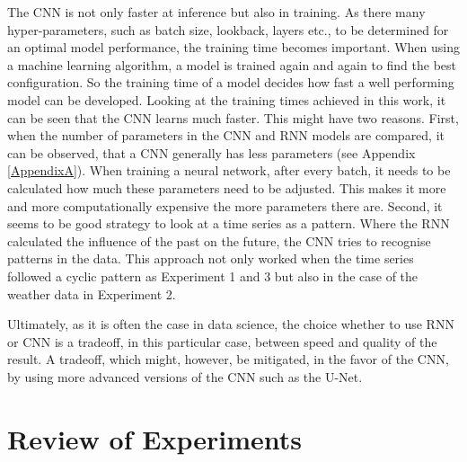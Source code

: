 The CNN is not only faster at inference but also in training. As there many hyper-parameters, such as batch size, lookback, layers etc., to be determined for an optimal model performance, the training time becomes important. When using a machine learning algorithm, a model is trained again and again to find the best configuration. So the training time of a model decides how fast a well performing model can be developed. Looking at the training times achieved in this work, it can be seen that the CNN learns much faster. This might have two reasons. First, when the number of parameters in the CNN and RNN models are compared, it can be observed, that a CNN generally has less parameters (see Appendix \ref{AppendixA}). When training a neural network, after every batch, it needs to be calculated how much these parameters need to be adjusted. This makes it more and more computationally expensive the more parameters there are. Second, it seems to be good strategy to look at a time series as a pattern. Where the RNN calculated the influence of the past on the future, the CNN tries to recognise patterns in the data. This approach not only worked when the time series followed a cyclic pattern as Experiment 1 and 3 but also in the case of the weather data in Experiment 2.     

Ultimately, as it is often the case in data science, the choice whether to use RNN or CNN is a tradeoff, in this particular case, between speed and quality of the result. A tradeoff, which might, however, be mitigated, in the favor of the CNN, by using more advanced versions of the CNN such as the U-Net.


\section{Review of Experiments}





